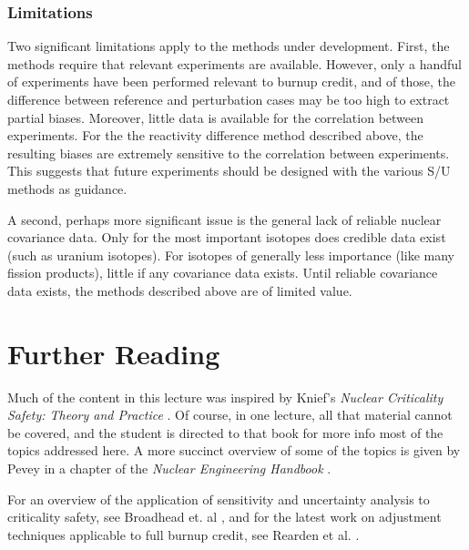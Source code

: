 \subsubsection{Limitations}

Two significant limitations apply to the methods under development.  First,
the methods require that relevant experiments are available.  However,
only a handful of experiments have been performed relevant to burnup credit,
and of those, the difference between reference and perturbation cases may 
be too high to extract partial biases.  Moreover, little data is available
for the correlation between experiments.  For the the reactivity difference
method described above, the resulting biases are extremely sensitive to 
the correlation between experiments. This suggests that future 
experiments should be designed with the various S/U methods as guidance.

A second, perhaps more significant issue is the general lack of reliable
nuclear covariance data.  Only for the most important isotopes does credible
data exist (such as uranium isotopes).  For isotopes of generally less
importance (like many fission products), little if any covariance data
exists.  Until reliable covariance data exists, the methods described
above are of limited value.
 
\section{Further Reading}

Much of the content in this lecture was inspired by Knief's 
\textit{Nuclear Criticality Safety: Theory and Practice} \cite{knief1991ncs}. 
 Of
course, in one lecture, all that material cannot be covered, and the student
is directed to that book for more info most of the topics addressed here.
A more succinct overview of some of the topics is given by 
Pevey in a chapter of the \textit{Nuclear Engineering Handbook} 
\cite{pevey2010neu}.  

For an overview of the application of sensitivity and uncertainty analysis
to criticality safety, see Broadhead et. al \cite{broadhead2004sau}, and
for the latest work on adjustment techniques applicable to full burnup
credit, see Rearden et al. \cite{rearden2011sua}.